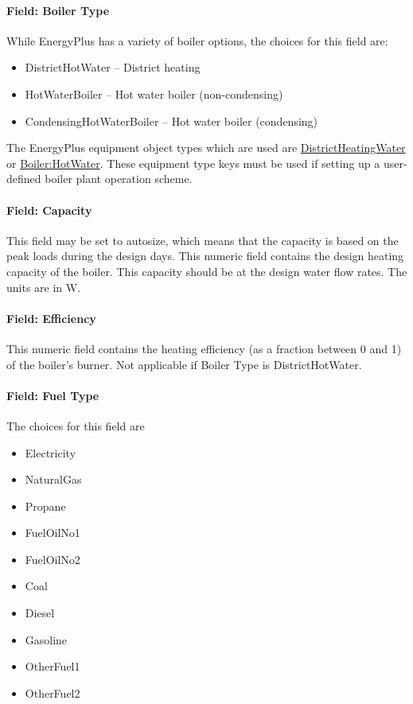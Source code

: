 \paragraph{Field: Boiler Type}\label{field-boiler-type}

While EnergyPlus has a variety of boiler options, the choices for this field are:

\begin{itemize}
\item
  DistrictHotWater -- District heating
\item
  HotWaterBoiler -- Hot water boiler (non-condensing)
\item
  CondensingHotWaterBoiler -- Hot water boiler (condensing)
\end{itemize}

The EnergyPlus equipment object types which are used are \hyperref[districtheating]{DistrictHeatingWater} or \hyperref[boilerhotwater]{Boiler:HotWater}. These equipment type keys must be used if setting up a user-defined boiler plant operation scheme.

\paragraph{Field: Capacity}\label{field-capacity-1}

This field may be set to autosize, which means that the capacity is based on the peak loads during the design days. This numeric field contains the design heating capacity of the boiler. This capacity should be at the design water flow rates. The units are in W.

\paragraph{Field: Efficiency}\label{field-efficiency-000}

This numeric field contains the heating efficiency (as a fraction between 0 and 1) of the boiler's burner. Not applicable if Boiler Type is DistrictHotWater.

\paragraph{Field: Fuel Type}\label{field-fuel-type-1-001}

The choices for this field are

\begin{itemize}
\item
  Electricity
\item
  NaturalGas
\item
  Propane
\item
  FuelOilNo1
\item
  FuelOilNo2
\item
  Coal
\item
  Diesel
\item
  Gasoline
\item
  OtherFuel1
\item
  OtherFuel2
\end{itemize}

